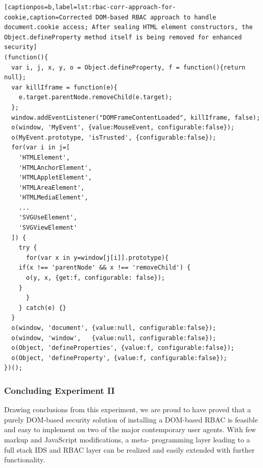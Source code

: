 \begin{lstlisting}[captionpos=b,label=lst:rbac-corr-approach-for-cookie,caption=Corrected DOM-based RBAC approach to handle document.cookie access; After sealing HTML element constructors, the Object.defineProperty method itself is being removed for enhanced security]
(function(){
  var i, j, x, y, o = Object.defineProperty, f = function(){return null}; 
  var killIframe = function(e){
    e.target.parentNode.removeChild(e.target);
  };
  window.addEventListener("DOMFrameContentLoaded", killIframe, false);
  o(window, 'MyEvent', {value:MouseEvent, configurable:false});
  o(MyEvent.prototype, 'isTrusted', {configurable:false});
  for(var i in j=[
    'HTMLElement',
    'HTMLAnchorElement',
    'HTMLAppletElement',
    'HTMLAreaElement',
    'HTMLMediaElement',
    ...
    'SVGUseElement',
    'SVGViewElement'
  ]) {
    try {
      for(var x in y=window[j[i]].prototype){
	if(x !== 'parentNode' && x !== 'removeChild') {
	  o(y, x, {get:f, configurable: false});
	}
      }
    } catch(e) {}
  }
  o(window, 'document', {value:null, configurable:false});
  o(window, 'window',   {value:null, configurable:false});
  o(Object, 'defineProperties', {value:f, configurable:false});
  o(Object, 'defineProperty', {value:f, configurable:false});
})();
\end{lstlisting}

      \subsubsection{Concluding Experiment II}

      Drawing conclusions from this experiment, we are proud to have proved that a purely DOM-based security solution of installing a DOM-based RBAC is feasible and easy to implement on two of the major contemporary user agents. With few markup and JavaScript modifications, a meta- programming layer leading to a full stack IDS and RBAC layer can be realized and easily extended with further functionality. %


